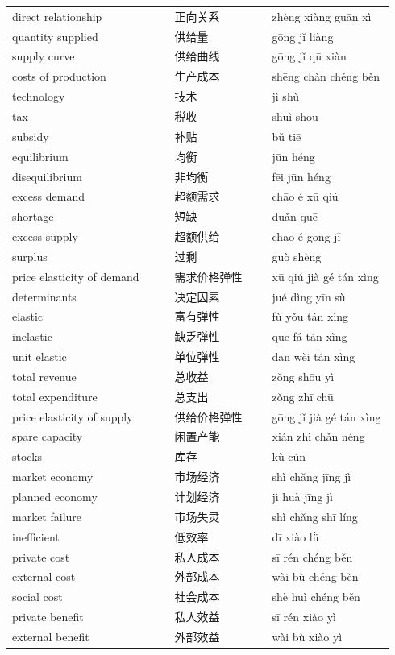 \documentclass[11pt]{article}
\begin{document}
\begin{longtable}{@{}p{0.40\linewidth}p{0.24\linewidth}p{0.30\linewidth}@{}}
direct relationship & 正向关系 & zhèng xiàng guān xì \\
quantity supplied & 供给量 & gōng jǐ liàng \\
supply curve & 供给曲线 & gōng jǐ qū xiàn \\
costs of production & 生产成本 & shēng chǎn chéng běn \\
technology & 技术 & jì shù \\
tax & 税收 & shuì shōu \\
subsidy & 补贴 & bǔ tiē \\
equilibrium & 均衡 & jūn héng \\
disequilibrium & 非均衡 & fēi jūn héng \\
excess demand & 超额需求 & chāo é xū qiú \\
shortage & 短缺 & duǎn quē \\
excess supply & 超额供给 & chāo é gōng jǐ \\
surplus & 过剩 & guò shèng \\
price elasticity of demand & 需求价格弹性 & xū qiú jià gé tán xìng \\
determinants & 决定因素 & jué dìng yīn sù \\
elastic & 富有弹性 & fù yǒu tán xìng \\
inelastic & 缺乏弹性 & quē fá tán xìng \\
unit elastic & 单位弹性 & dān wèi tán xìng \\
total revenue & 总收益 & zǒng shōu yì \\
total expenditure & 总支出 & zǒng zhī chū \\
price elasticity of supply & 供给价格弹性 & gōng jǐ jià gé tán xìng \\
spare capacity & 闲置产能 & xián zhì chǎn néng \\
stocks & 库存 & kù cún \\
market economy & 市场经济 & shì chǎng jīng jì \\
planned economy & 计划经济 & jì huà jīng jì \\
market failure & 市场失灵 & shì chǎng shī líng \\
inefficient & 低效率 & dī xiào lǜ \\
private cost & 私人成本 & sī rén chéng běn \\
external cost & 外部成本 & wài bù chéng běn \\
social cost & 社会成本 & shè huì chéng běn \\
private benefit & 私人效益 & sī rén xiào yì \\
external benefit & 外部效益 & wài bù xiào yì \\

\end{longtable}
\end{document}
